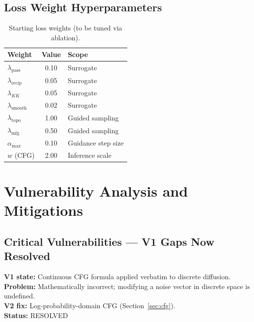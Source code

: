 \documentclass[12pt,a4paper]{article}
\newcommand{\alphamax}{\alpha_{\max}}
\theoremstyle{definition}
\theoremstyle{plain}
\theoremstyle{remark}
\begin{document}
\subsection{Loss Weight Hyperparameters}

\begin{table}[H]
\centering
\caption{Starting loss weights (to be tuned via ablation).}
\label{tab:lossweights}
\begin{tabular}{lcl}
\toprule
\textbf{Weight} & \textbf{Value} & \textbf{Scope} \\
\midrule
$\lambda_{\mathrm{pass}}$   & 0.10 & Surrogate \\
$\lambda_{\mathrm{recip}}$  & 0.05 & Surrogate \\
$\lambda_{KK}$              & 0.05 & Surrogate \\
$\lambda_{\mathrm{smooth}}$ & 0.02 & Surrogate \\
$\lambda_{\mathrm{topo}}$   & 1.00 & Guided sampling \\
$\lambda_{\mathrm{mfg}}$    & 0.50 & Guided sampling \\
$\alphamax$                 & 0.10 & Guidance step size \\
$w$ (CFG)                   & 2.00 & Inference scale \\
\bottomrule
\end{tabular}
\end{table}

\section{Vulnerability Analysis and Mitigations}
\label{sec:vulnerabilities}

\subsection{Critical Vulnerabilities — V1 Gaps Now Resolved}

\begin{tcolorbox}[fixbox, title=V-CRIT-1: CFG Formulation for Discrete Diffusion]
\textbf{V1 state:} Continuous CFG formula applied verbatim to discrete diffusion.\\
\textbf{Problem:} Mathematically incorrect; modifying a noise vector in discrete space
is undefined.\\
\textbf{V2 fix:} Log-probability-domain CFG (Section~\ref{sec:cfg}).\\
\textbf{Status:} \textcolor{okgreen}{RESOLVED}
\end{tcolorbox}
\end{document}
